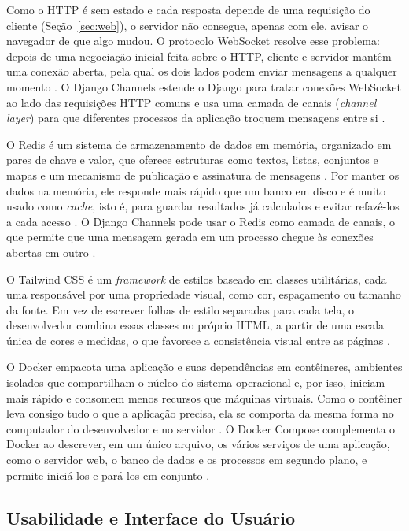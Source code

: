 Como o HTTP é sem estado e cada resposta depende de uma requisição do cliente (Seção~\ref{sec:web}), o servidor não consegue, apenas com ele, avisar o navegador de que algo mudou. O protocolo WebSocket resolve esse problema: depois de uma negociação inicial feita sobre o HTTP, cliente e servidor mantêm uma conexão aberta, pela qual os dois lados podem enviar mensagens a qualquer momento \cite{rfc6455}. O Django Channels estende o Django para tratar conexões WebSocket ao lado das requisições HTTP comuns e usa uma camada de canais (\textit{channel layer}) para que diferentes processos da aplicação troquem mensagens entre si \cite{channelsdocs}.

O Redis é um sistema de armazenamento de dados em memória, organizado em pares de chave e valor, que oferece estruturas como textos, listas, conjuntos e mapas e um mecanismo de publicação e assinatura de mensagens \cite{redisdocs}. Por manter os dados na memória, ele responde mais rápido que um banco em disco e é muito usado como \textit{cache}, isto é, para guardar resultados já calculados e evitar refazê-los a cada acesso \cite{redisdocs}. O Django Channels pode usar o Redis como camada de canais, o que permite que uma mensagem gerada em um processo chegue às conexões abertas em outro \cite{channelsdocs}.

O Tailwind CSS é um \textit{framework} de estilos baseado em classes utilitárias, cada uma responsável por uma propriedade visual, como cor, espaçamento ou tamanho da fonte. Em vez de escrever folhas de estilo separadas para cada tela, o desenvolvedor combina essas classes no próprio HTML, a partir de uma escala única de cores e medidas, o que favorece a consistência visual entre as páginas \cite{tailwinddocs}.

O Docker empacota uma aplicação e suas dependências em contêineres, ambientes isolados que compartilham o núcleo do sistema operacional e, por isso, iniciam mais rápido e consomem menos recursos que máquinas virtuais. Como o contêiner leva consigo tudo o que a aplicação precisa, ela se comporta da mesma forma no computador do desenvolvedor e no servidor \cite{dockerdocs}. O Docker Compose complementa o Docker ao descrever, em um único arquivo, os vários serviços de uma aplicação, como o servidor web, o banco de dados e os processos em segundo plano, e permite iniciá-los e pará-los em conjunto \cite{dockerdocs}.

\subsection{Usabilidade e Interface do Usuário}
\label{sec:usab}

